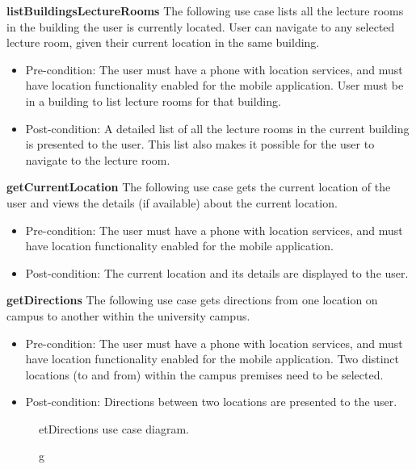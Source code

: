 \documentclass[12pt,a4paper]{article}
\begin{document}
		    \textbf{listBuildingsLectureRooms}
            The following use case lists all the lecture rooms in the building the user is currently located. User can              	        navigate to any selected lecture room, given their current location in the same building.
			
			\begin{itemize}
			\item Pre-condition: The user must have a phone with location services, and must have location functionality 			              enabled for the mobile application. User must be in a building to list lecture rooms for that building.
			\item Post-condition: A detailed list of all the lecture rooms in the current building is presented to the user. 					  This list also makes it possible for the user to navigate to the lecture room.
			\end{itemize}
			
		    \textbf{getCurrentLocation}
			The following use case gets the current location of the user and views the details (if available) about the 		            current location.
			
			\begin{itemize}
			\item Pre-condition: The user must have a phone with location services, and must have location functionality 			              enabled for the mobile application.
			\item Post-condition: The current location and its details are displayed to the user.
			\end{itemize}
			
	        \textbf{getDirections}
			The following use case gets directions from one location on campus to another within the university campus.
			
			\begin{itemize}
			\item Pre-condition: The user must have a phone with location services, and must have location functionality 						  enabled for the mobile application. Two distinct locations (to and from) within the campus premises need to        			      be selected.
			\item Post-condition: Directions between two locations are presented to the user.
			\end{itemize}
			
			\begin{figure}[h!]
				\caption getDirections use case diagram.
			\end{figure}
			
\end{document}
